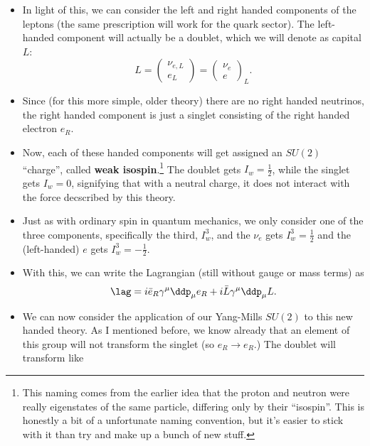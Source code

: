 \begin{itemize}
\begin{equation}
        \end{equation}
    \item In light of this, we can consider the left and right handed components of the leptons (the same prescription will work for the quark sector). The left-handed component will actually be a doublet, which we will denote as capital $L$:
        \begin{equation}
            L = \begin{pmatrix}\nu_{e,L} \\ e_L\end{pmatrix} = \begin{pmatrix}\nu_e \\ e\end{pmatrix}_L.
        \end{equation}
    \item Since (for this more simple, older theory) there are no right handed neutrinos, the right handed component is just a singlet consisting of the right handed electron $e_R$.
    \item Now, each of these handed components will get assigned an $SU(2)$ ``charge'', called \textbf{weak isospin}.\footnote{This naming comes from the earlier idea that the proton and neutron were really eigenstates of the same particle, differing only by their ``isospin''. This is honestly a bit of a unfortunate naming convention, but it's easier to stick with it than try and make up a bunch of new stuff.} The doublet gets $I_w = \frac{1}{2}$, while the singlet gets $I_w=0$, signifying that with a neutral charge, it does not interact with the force decscribed by this theory.
    \item Just as with ordinary spin in quantum mechanics, we only consider one of the three components, specifically the third, $I_w^3$, and the $\nu_e$ gets $I_w^3=\frac{1}{2}$ and the (left-handed) $e$ gets $I_w^3=-\frac{1}{2}$.
    \item With this, we can write the Lagrangian (still without gauge or mass terms) as 
        \begin{equation}
            \lag = i \bar{e}_R \gamma^{\mu} \ddp_{\mu} e_R + i\bar{L} \gamma^{\mu}\ddp_{\mu} L.
        \end{equation}
    \item We can now consider the application of our Yang-Mills $SU(2)$ to this new handed theory. As I mentioned before, we know already that an element of this group will not transform the singlet (so $e_R \rightarrow e_R$.) The doublet will transform like
        \begin{equation}

\end{equation}
\end{itemize}
